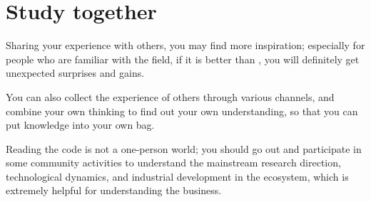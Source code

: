 \section{Study together}
\begin{content}
Sharing your experience with others, you may find more inspiration; especially for people who are familiar with the field, if it is better than , you will definitely get unexpected surprises and gains.

You can also collect the experience of others through various channels, and combine your own thinking to find out your own understanding, so that you can put knowledge into your own bag.

Reading the code is not a one-person world; you should go out and participate in some community activities to understand the mainstream research direction, technological dynamics, and industrial development in the ecosystem, which is extremely helpful for understanding the business.
\end{content}
